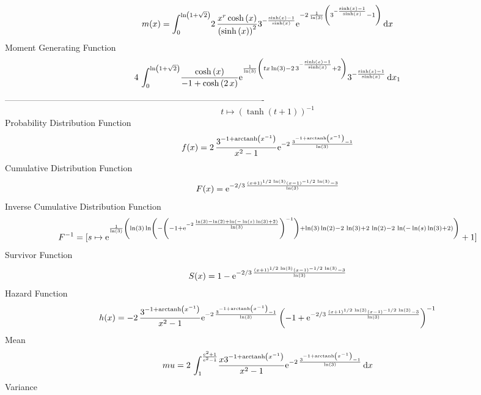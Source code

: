 \documentclass[12pt]{article}
\begin{document}
 $$ m(x) = \int_{0}^{\ln  \left( 1+\sqrt {2} \right) }\!2\,{\frac {{x}^{r}\cosh
 \left( x \right) }{ \left( \sinh \left( x \right)  \right) ^{2}}{3}^{
-{\frac {\sinh \left( x \right) -1}{\sinh \left( x \right) }}}{{\rm e}
^{-2\,{\frac {1}{\ln  \left( 3 \right) } \left( {3}^{-{\frac {\sinh
 \left( x \right) -1}{\sinh \left( x \right) }}}-1 \right) }}}}
\,{\rm d}x
$$ Moment Generating Function 
 $$4\,\int_{0}^{\ln  \left( 1+\sqrt {2} \right) }\!{\frac {\cosh \left( x
 \right) }{-1+\cosh \left( 2\,x \right) }{{\rm e}^{{\frac {1}{\ln 
 \left( 3 \right) } \left( tx\ln  \left( 3 \right) -2\,{3}^{-{\frac {
\sinh \left( x \right) -1}{\sinh \left( x \right) }}}+2 \right) }}}{3}
^{-{\frac {\sinh \left( x \right) -1}{\sinh \left( x \right) }}}}
\,{\rm d}x_{{1}}
$$-------------------------------------------------------------------------------------------  \\$$t\mapsto  \left( \tanh \left( t+1 \right)  \right) ^{-1}
$$Probability Distribution Function 
$$  f(x)=2\,{\frac {{3}^{-1+{\rm arctanh} \left({x}^{-1}\right)}}{{x}^{2}-1}{
{\rm e}^{-2\,{\frac {{3}^{-1+{\rm arctanh} \left({x}^{-1}\right)}-1}{
\ln  \left( 3 \right) }}}}}
$$Cumulative Distribution Function  
 $$F(x)={{\rm e}^{-2/3\,{\frac { \left( x+1 \right) ^{1/2\,\ln  \left( 3
 \right) } \left( x-1 \right) ^{-1/2\,\ln  \left( 3 \right) }-3}{\ln 
 \left( 3 \right) }}}}
$$ Inverse Cumulative Distribution Function 
  $$F^{-1} = [s\mapsto {{\rm e}^{{\frac {1}{\ln  \left( 3 \right) } \left( \ln 
 \left( 3 \right) \ln  \left( - \left( -1+{{\rm e}^{-2\,{\frac {\ln 
 \left( 3 \right) -\ln  \left( 2 \right) +\ln  \left( -\ln  \left( s
 \right) \ln  \left( 3 \right) +2 \right) }{\ln  \left( 3 \right) }}}}
 \right) ^{-1} \right) +\ln  \left( 3 \right) \ln  \left( 2 \right) -2
\,\ln  \left( 3 \right) +2\,\ln  \left( 2 \right) -2\,\ln  \left( -
\ln  \left( s \right) \ln  \left( 3 \right) +2 \right)  \right) }}}+1]
$$Survivor Function 
 $$ S(x)=1-{{\rm e}^{-2/3\,{\frac { \left( x+1 \right) ^{1/2\,\ln  \left( 3
 \right) } \left( x-1 \right) ^{-1/2\,\ln  \left( 3 \right) }-3}{\ln 
 \left( 3 \right) }}}}
$$ Hazard Function 
 $$ h(x)=-2\,{\frac {{3}^{-1+{\rm arctanh} \left({x}^{-1}\right)}}{{x}^{2}-1}{
{\rm e}^{-2\,{\frac {{3}^{-1+{\rm arctanh} \left({x}^{-1}\right)}-1}{
\ln  \left( 3 \right) }}}} \left( -1+{{\rm e}^{-2/3\,{\frac { \left( x
+1 \right) ^{1/2\,\ln  \left( 3 \right) } \left( x-1 \right) ^{-1/2\,
\ln  \left( 3 \right) }-3}{\ln  \left( 3 \right) }}}} \right) ^{-1}}
$$Mean 
 $$ mu=2\,\int_{1}^{{\frac {{{\rm e}^{2}}+1}{{{\rm e}^{2}}-1}}}\!{\frac {x{3}
^{-1+{\rm arctanh} \left({x}^{-1}\right)}}{{x}^{2}-1}{{\rm e}^{-2\,{
\frac {{3}^{-1+{\rm arctanh} \left({x}^{-1}\right)}-1}{\ln  \left( 3
 \right) }}}}}\,{\rm d}x
$$ Variance 
\end{document}
